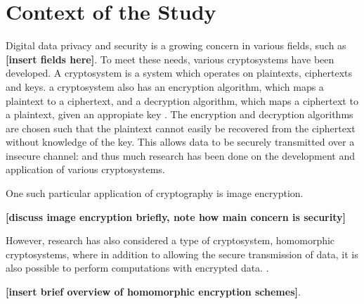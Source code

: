 
\section{Context of the Study}

Digital data privacy and security is a growing concern in various fields, such as  \textbf{[insert fields here]}. To meet these needs, various cryptosystems have been developed. A cryptosystem is a system which operates on plaintexts, ciphertexts and keys. a cryptosystem also has an encryption algorithm, which maps a plaintext to a ciphertext, and a decryption algorithm, which maps a ciphertext to a plaintext, given an appropiate key \cite[p.119]{tilborg_encyclopedia_2005}. The encryption and decryption algorithms are chosen such that the plaintext cannot easily be recovered from the ciphertext without knowledge of the key. This allows data to be securely transmitted over a insecure channel:  and thus much research has been done on the development and application of various cryptosystems.

One such particular application of cryptography is image encryption. \cite{arul_murugan_survey_2018}

\textbf{[discuss image encryption briefly, note how main concern is security]}

However, research has also considered a type of cryptosystem, homomorphic cryptosystems, where in addition to allowing the secure transmission of data, it is also possible to perform computations with encrypted data. \cite{fontaine_survey_2007}.

\textbf{[insert brief overview of homomorphic encryption schemes]}.
